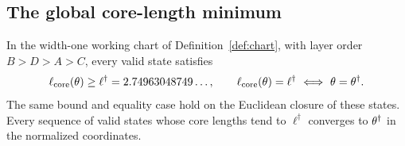 \subsection{The global core-length minimum}

\begin{theorem}\label{thm:globalcore}
In the width-one working chart of Definition~\ref{def:chart}, with layer order $B>D>A>C$, every valid state satisfies
\[
  \ell_{\mathrm{core}}(\theta)\ge\ell^\dagger=2.74963048749\ldots ,
  \qquad \ell_{\mathrm{core}}(\theta)=\ell^\dagger\ \Longleftrightarrow\ \theta=\theta^\dagger .
\]
The same bound and equality case hold on the Euclidean closure of these states. Every sequence of valid states whose core lengths tend to $\ell^\dagger$ converges to $\theta^\dagger$ in the normalized coordinates.
\end{theorem}

